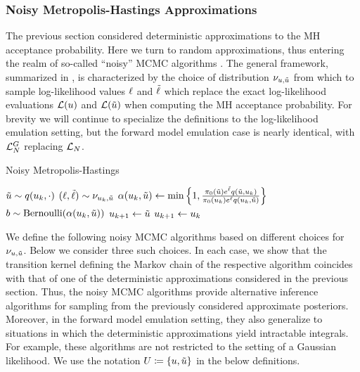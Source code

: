 \documentclass[12pt]{article}
\begin{document}
\subsubsection{Noisy Metropolis-Hastings Approximations}
The previous section considered deterministic approximations to the MH acceptance probability. Here we turn 
to random approximations, thus entering the realm of so-called ``noisy'' MCMC algorithms 
\cite{noisyMCMC, stabilityNoisyMH, noisyMCSurvey, pseudoMarginalMCMC}. The general framework,
summarized in , is characterized by the choice of distribution $\llikSampDist_{\Par, \propPar}$
from which to sample log-likelihood values $\llikSamp$ and $\llikSampProp$ which replace the exact 
log-likelihood evaluations $\llik(\Par)$ and $\llik(\propPar)$ when computing the MH acceptance probability. 
For brevity we will continue to specialize the definitions to the log-likelihood emulation setting, but the forward model 
emulation case is nearly identical, with $\llikEmFwd$ replacing $\llikEm$. 

\begin{algorithm}
    \caption{Noisy Metropolis-Hastings}
    \label{alg:noisy-MH}
    \begin{algorithmic}[1] %
        		\State $\propPar \sim \propDens(\indexMCMC{\Par}, \cdot)$ 
		\State $(\llikSamp, \llikSampProp) \sim \llikSampDist_{\indexMCMC{\Par}, \propPar}$  
		\State $\accProbMH(\indexMCMC{\Par}, \propPar) \gets \min\left\{1, \frac{\priorDens(\propPar)e^{\llikSampProp} 
				\propDens(\propPar, \indexMCMC{\Par})}{\priorDens(\indexMCMC{\Par}) e^{\llikSamp}  \propDens(\indexMCMC{\Par}, \propPar)} \right\}$
		\State $b \sim \text{Bernoulli}(\accProbMH(\indexMCMC{\Par}, \propPar))$
			\State $\indexMCMC[\mcmcIndex+1]{\Par} \gets \propPar$ 
		\Else
			\State $\indexMCMC[\mcmcIndex+1]{\Par} \gets \indexMCMC{\Par}$
		\EndIf
	\EndFor
	\EndFunction
    \end{algorithmic}
\end{algorithm}

We define the following noisy MCMC algorithms based on different choices for $\llikSampDist_{\Par, \propPar}$.
Below we consider three such choices. In each case, we show that the transition kernel defining the Markov chain 
of the respective algorithm coincides with that of one of the deterministic approximations considered in the previous 
section. Thus, the noisy MCMC algorithms provide alternative inference algorithms for sampling from the previously 
considered approximate posteriors. Moreover, in the forward model emulation setting, they also generalize to 
situations in which the deterministic approximations yield intractable integrals. For example, these algorithms are 
not restricted to the setting of a Gaussian likelihood.  
We use the notation $\parMat \Def \{\Par, \propPar\}$ in the below definitions. 
\end{document}
